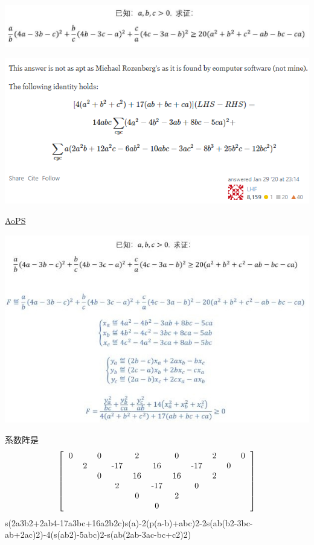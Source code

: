 \documentclass[UTF8]{ctexart}
\begin{document}
\subsection{}
\begin{center}
	\includegraphics[width=0.6\linewidth]{a25}
\end{center}
\begin{center}
	\includegraphics[width=0.8\linewidth]{a26}
\end{center}
\href{https://math.stackexchange.com/questions/3527494/}{AoPS}
\begin{center}
	\includegraphics[width=0.7\linewidth]{a27}
\end{center}
系数阵是\renewcommand*{\arraystretch}{1.732}\[
\left[\begin{matrix}
	\begin{tabular}{ccccccccccccc}
		0& &0& &2& &0& &2& &0\\
		&2& &-17& &16& &-17& &0&\\
		& &0& &16& &16& &2& &\\
		& & &2& &-17& &0& & &\\
		& & & &0& &2& & & &\\
		& & & & &0& & & & &\\
	\end{tabular}
\end{matrix}\right]
\]
s(2a3b2+2ab4-17a3bc+16a2b2c)s(a)-2(p(a-b)+abc)2-2s(ab(b2-3bc-ab+2ac)2)-4(s(ab2)-5abc)2-s(ab(2ab-3ac-bc+c2)2)
\end{document}
